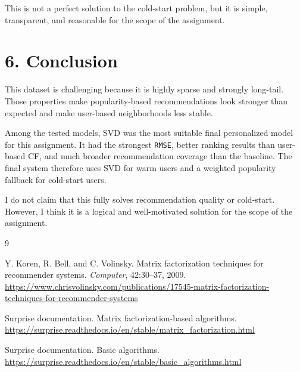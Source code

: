 \documentclass[10pt,a4paper]{article}
\begin{document}
This is not a perfect solution to the cold-start problem, but it is simple, transparent, and reasonable for the scope of the assignment.

\section*{6. Conclusion}
This dataset is challenging because it is highly sparse and strongly long-tail. Those properties make popularity-based recommendations look stronger than expected and make user-based neighborhoods less stable.

Among the tested models, SVD was the most suitable final personalized model for this assignment. It had the strongest \texttt{RMSE}, better ranking results than user-based CF, and much broader recommendation coverage than the baseline. The final system therefore uses SVD for warm users and a weighted popularity fallback for cold-start users.

I do not claim that this fully solves recommendation quality or cold-start. However, I think it is a logical and well-motivated solution for the scope of the assignment.

\begin{thebibliography}{9}

Y. Koren, R. Bell, and C. Volinsky.
\newblock Matrix factorization techniques for recommender systems.
\newblock \emph{Computer}, 42:30--37, 2009.
\newblock \url{https://www.chrisvolinsky.com/publications/17545-matrix-factorization-techniques-for-recommender-systems}

Surprise documentation.
\newblock Matrix factorization-based algorithms.
\newblock \url{https://surprise.readthedocs.io/en/stable/matrix_factorization.html}

Surprise documentation.
\newblock Basic algorithms.
\newblock \url{https://surprise.readthedocs.io/en/stable/basic_algorithms.html}

\end{thebibliography}
\end{document}

